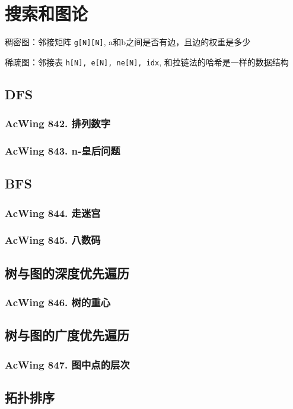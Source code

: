 \chapter{搜索和图论}

稠密图：邻接矩阵 \lstinline{g[N][N]}, a和b之间是否有边，且边的权重是多少

稀疏图：邻接表 \lstinline{h[N], e[N], ne[N], idx}, 和拉链法的哈希是一样的数据结构

\section{DFS}
\subsection{AcWing 842. 排列数字}
\subsection{AcWing 843. n-皇后问题}

\section{BFS}
\subsection{AcWing 844. 走迷宫}
\subsection{AcWing 845. 八数码}

\section{树与图的深度优先遍历}
\subsection{AcWing 846. 树的重心}

\section{树与图的广度优先遍历}
\subsection{AcWing 847. 图中点的层次}

\section{拓扑排序}
